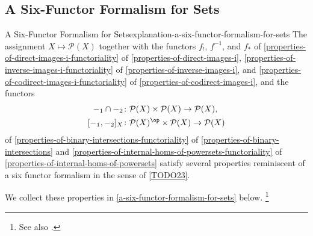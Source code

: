 \subsection{A Six-Functor Formalism for Sets}\label{subsection-a-six-functor-formalism-for-sets}
\begin{explanation}{A Six-Functor Formalism for Sets}{explanation-a-six-functor-formalism-for-sets}%
    The assignment $X\mapsto\mathcal{P}(X)$ together with the functors $f_{!}$, $f^{-1}$, and $f_{*}$ of \cref{properties-of-direct-images-i-functoriality} of \cref{properties-of-direct-images-i}, \cref{properties-of-inverse-images-i-functoriality} of \cref{properties-of-inverse-images-i}, and \cref{properties-of-codirect-images-i-functoriality} of \cref{properties-of-codirect-images-i}, and the functors
    \begin{align*}
        -_{1}\cap-_{2}    &\colon \mathcal{P}(X)\times\mathcal{P}(X) \to \mathcal{P}(X),\\
        [-_{1},-_{2}]_{X} &\colon \mathcal{P}(X)^{\op}\times\mathcal{P}(X) \to \mathcal{P}(X)
    \end{align*}
    of \cref{properties-of-binary-intersections-functoriality} of \cref{properties-of-binary-intersections} and \cref{properties-of-internal-homs-of-powersets-functoriality} of \cref{properties-of-internal-homs-of-powersets} satisfy several properties reminiscent of a six functor formalism in the sense of \cref{TODO23}.

    \indent We collect these properties in \cref{a-six-functor-formalism-for-sets} below.%
    \footnote{%
        See also \cite{nlab:interactions-of-images-and-pre-images-with-unions-and-intersections}.
        \par\vspace*{\TCBBoxCorrection}
    }%
\end{explanation}
